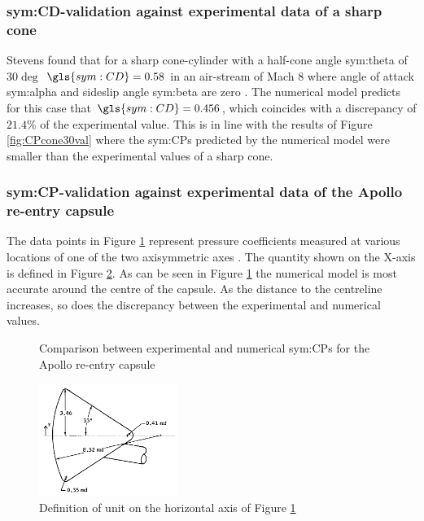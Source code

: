 \subsubsection{\gls{sym:CD}-validation against experimental data of a sharp cone}
\label{subsubsec:valsharpconeCD}
Stevens found that for a sharp cone-cylinder with a half-cone angle \gls{sym:theta} of $30\deg$ $\gls{sym:CD}=0.58$ in an air-stream of Mach $8$ where angle of attack \gls{sym:alpha} and sideslip angle \gls{sym:beta} are zero \cite{Stevens1950,AndersonJr.2007}. The numerical model predicts for this case that $\gls{sym:CD}=0.456$, which coincides with a discrepancy of $21.4\%$ of the experimental value. This is in line with the results of Figure \ref{fig:CPcone30val} where the \glspl{sym:CP} predicted by the numerical model were smaller than the experimental values of a sharp cone.

\subsubsection{\gls{sym:CP}-validation against experimental data of the Apollo re-entry capsule}
\label{subsubsec:Apollo_validation}
The data points in Figure \ref{fig:Apollo_cp} represent pressure coefficients measured at various locations of one of the two axisymmetric axes \cite{Bertin1966}. The quantity shown on the X-axis is defined in Figure \ref{fig:Apollo_y}. As can be seen in Figure \ref{fig:Apollo_cp} the numerical model is most accurate around the centre of the capsule. As the distance to the centreline increases, so does the discrepancy between the experimental and numerical values.

\begin{figure}[H]
	\centering
	\setlength{} 
	\setlength{}
	
	\caption{Comparison between experimental and numerical \glspl{sym:CP} for the Apollo re-entry capsule}
	\label{fig:Apollo_cp}
\end{figure}

\begin{figure}[H]
	\centering
	\includegraphics[width=0.4\textwidth]{./Figure/Apollo_model}
	\caption{Definition of unit on the horizontal axis of Figure \ref{fig:Apollo_cp} \cite{Bertin1966}}
	\label{fig:Apollo_y}
\end{figure}

